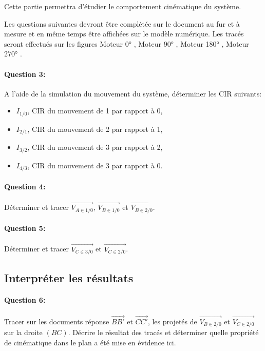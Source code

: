 Cette partie permettra d'étudier le comportement cinématique du système.

Les questions suivantes devront être complétée sur le document au fur et à mesure et en même temps être affichées sur le modèle numérique. Les tracés seront effectués sur les figures \og Moteur 0° \fg, \og Moteur 90° \fg, \og Moteur 180° \fg, \og Moteur 270° \fg.

\paragraph{Question 3:} A l'aide de la simulation du mouvement du système, déterminer les CIR suivants:
\begin{itemize}
 \item $I_{1/0}$, CIR du mouvement de 1 par rapport à 0,
 \item $I_{2/1}$, CIR du mouvement de 2 par rapport à 1,
 \item $I_{3/2}$, CIR du mouvement de 3 par rapport à 2,
 \item $I_{4/3}$, CIR du mouvement de 3 par rapport à 0.
\end{itemize}

\paragraph{Question 4:} Déterminer et tracer $\overrightarrow{V_{A\in 1/0}}$, $\overrightarrow{V_{B\in 1/0}}$ et $\overrightarrow{V_{B\in 2/0}}$.

\reponse[1]

\paragraph{Question 5:} Déterminer et tracer $\overrightarrow{V_{C\in 3/0}}$ et $\overrightarrow{V_{C\in 2/0}}$.

\reponse[1]

\subsection{Interpréter les résultats}
	
\paragraph{Question 6:} Tracer sur les documents réponse $\overrightarrow{BB'}$ et $\overrightarrow{CC'}$, les projetés de $\overrightarrow{V_{B\in 2/0}}$ et $\overrightarrow{V_{C\in 2/0}}$ sur la droite $(BC)$. Décrire le résultat des tracés et déterminer quelle propriété de cinématique dans le plan a été mise en évidence ici.
	
